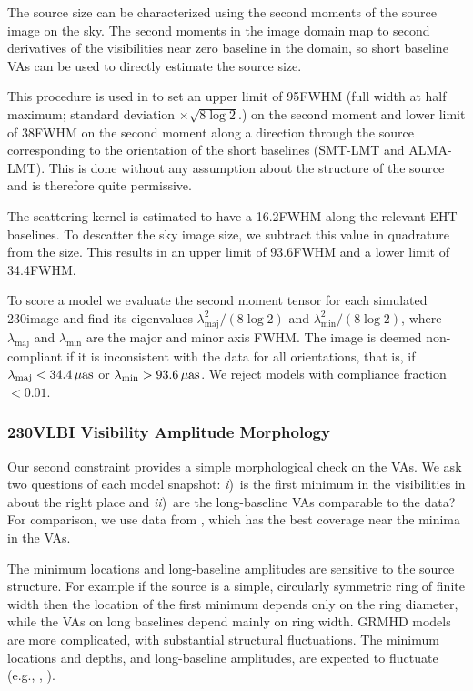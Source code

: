 The source size can be characterized using the second moments of the
source image on the sky.
The second moments in the image domain map to second derivatives of
the visibilities near zero baseline in the \uv domain, so short
baseline VAs can be used to directly estimate the source size.

This procedure is used in  to set an upper limit
of 95\uas FWHM (full width at half maximum; standard deviation $\times \sqrt{8\log{2}}$.) on the second moment and lower limit of 38\uas FWHM on the second moment along a direction
through the source corresponding to the orientation of the short
baselines (SMT-LMT and ALMA-LMT).  This is done without any assumption
about the structure of the source and is therefore quite  permissive.

The scattering kernel is estimated to have a 16.2\uas FWHM along the
relevant EHT baselines.
To descatter the sky image size, we subtract this value in quadrature
from the size.
This results in an upper limit of 93.6\uas FWHM and a lower limit of
34.4\uas FWHM.

To score a model we evaluate the second moment tensor for each simulated 230\GHz image
and find its eigenvalues $\lambda_\mathrm{maj}^2/(8\log 2)$ and $\lambda_\mathrm{min}^2/(8\log
2)$, where $\lambda_\mathrm{maj}$ and $\lambda_\mathrm{min}$ are the major and minor axis
FWHM.
The image is deemed non-compliant if it is inconsistent with the data for
all orientations, that is, if $\lambda_\mathrm{maj} < 34.4\,\mathrm{\mu as}$ or
$\lambda_\mathrm{min} > 93.6\,\mathrm{\mu as}$.
We reject models with compliance fraction $< 0.01$.

\subsubsection{230\GHz VLBI Visibility Amplitude Morphology}

Our second constraint provides a simple morphological check on the
VAs.  We ask two questions of each model snapshot: \emph{i})~is the first
minimum in the visibilities in about the right place and
\emph{ii})~are the long-baseline VAs comparable to the data?
For comparison, we use data from \aprilvii, which has the best \uv
coverage near the minima in the VAs.

The minimum locations and long-baseline amplitudes are sensitive to the
source structure.
For example if the source is a simple, circularly symmetric ring of
finite width then the location of the first minimum depends only on
the ring diameter, while the VAs on long baselines depend mainly on
ring width.
GRMHD models are more complicated, with substantial structural
fluctuations.
The minimum locations and depths, and long-baseline amplitudes, are
expected to fluctuate (e.g., \citealt{2018ApJ...856..163M},
).

